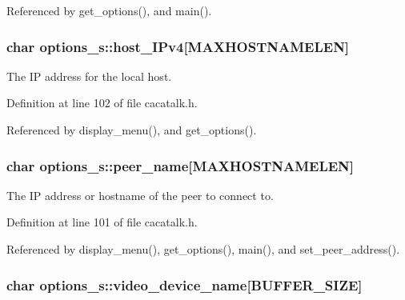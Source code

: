 \-Referenced by get\-\_\-options(), and main().

\hypertarget{structoptions__s_a6eae09fe8cfc8e82b1f9b683f4f3e982}{
\subsubsection[{host\-\_\-\-I\-Pv4}]{\setlength{\rightskip}{0pt plus 5cm}char {\bf options\-\_\-s\-::host\-\_\-\-I\-Pv4}\mbox{[}\-M\-A\-X\-H\-O\-S\-T\-N\-A\-M\-E\-L\-E\-N\mbox{]}}}\label{structoptions__s_a6eae09fe8cfc8e82b1f9b683f4f3e982}


\-The \-I\-P address for the local host. 



\-Definition at line 102 of file cacatalk.\-h.



\-Referenced by display\-\_\-menu(), and get\-\_\-options().

\hypertarget{structoptions__s_a3bc5783f374ad410635b68a77c26e76d}{
\subsubsection[{peer\-\_\-name}]{\setlength{\rightskip}{0pt plus 5cm}char {\bf options\-\_\-s\-::peer\-\_\-name}\mbox{[}\-M\-A\-X\-H\-O\-S\-T\-N\-A\-M\-E\-L\-E\-N\mbox{]}}}\label{structoptions__s_a3bc5783f374ad410635b68a77c26e76d}


\-The \-I\-P address or hostname of the peer to connect to. 



\-Definition at line 101 of file cacatalk.\-h.



\-Referenced by display\-\_\-menu(), get\-\_\-options(), main(), and set\-\_\-peer\-\_\-address().

\hypertarget{structoptions__s_a361e705ec36167283f446c42276b0daf}{
\subsubsection[{video\-\_\-device\-\_\-name}]{\setlength{\rightskip}{0pt plus 5cm}char {\bf options\-\_\-s\-::video\-\_\-device\-\_\-name}\mbox{[}{\bf \-B\-U\-F\-F\-E\-R\-\_\-\-S\-I\-Z\-E}\mbox{]}}}\label{structoptions__s_a361e705ec36167283f446c42276b0daf}


